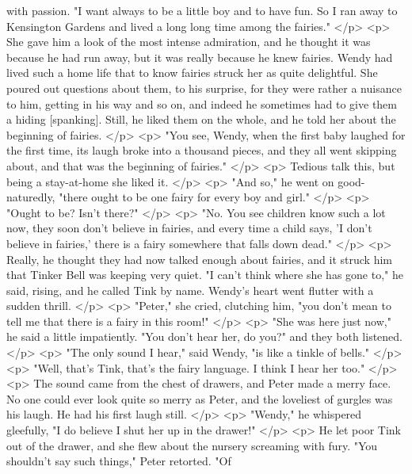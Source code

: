       with passion. "I want always to be a little boy and to have fun. So I ran
      away to Kensington Gardens and lived a long long time among the fairies."
    </p>
    <p>
      She gave him a look of the most intense admiration, and he thought it was
      because he had run away, but it was really because he knew fairies. Wendy
      had lived such a home life that to know fairies struck her as quite
      delightful. She poured out questions about them, to his surprise, for they
      were rather a nuisance to him, getting in his way and so on, and indeed he
      sometimes had to give them a hiding [spanking]. Still, he liked them on
      the whole, and he told her about the beginning of fairies.
    </p>
    <p>
      "You see, Wendy, when the first baby laughed for the first time, its laugh
      broke into a thousand pieces, and they all went skipping about, and that
      was the beginning of fairies."
    </p>
    <p>
      Tedious talk this, but being a stay-at-home she liked it.
    </p>
    <p>
      "And so," he went on good-naturedly, "there ought to be one fairy for
      every boy and girl."
    </p>
    <p>
      "Ought to be? Isn't there?"
    </p>
    <p>
      "No. You see children know such a lot now, they soon don't believe in
      fairies, and every time a child says, 'I don't believe in fairies,' there
      is a fairy somewhere that falls down dead."
    </p>
    <p>
      Really, he thought they had now talked enough about fairies, and it struck
      him that Tinker Bell was keeping very quiet. "I can't think where she has
      gone to," he said, rising, and he called Tink by name. Wendy's heart went
      flutter with a sudden thrill.
    </p>
    <p>
      "Peter," she cried, clutching him, "you don't mean to tell me that there
      is a fairy in this room!"
    </p>
    <p>
      "She was here just now," he said a little impatiently. "You don't hear
      her, do you?" and they both listened.
    </p>
    <p>
      "The only sound I hear," said Wendy, "is like a tinkle of bells."
    </p>
    <p>
      "Well, that's Tink, that's the fairy language. I think I hear her too."
    </p>
    <p>
      The sound came from the chest of drawers, and Peter made a merry face. No
      one could ever look quite so merry as Peter, and the loveliest of gurgles
      was his laugh. He had his first laugh still.
    </p>
    <p>
      "Wendy," he whispered gleefully, "I do believe I shut her up in the
      drawer!"
    </p>
    <p>
      He let poor Tink out of the drawer, and she flew about the nursery
      screaming with fury. "You shouldn't say such things," Peter retorted. "Of
